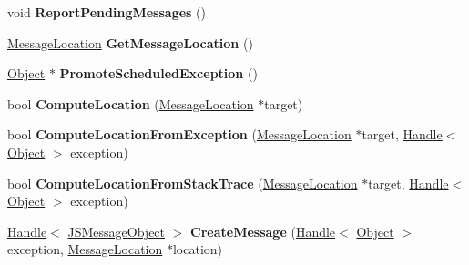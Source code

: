 \begin{DoxyCompactItemize}
\item 
void {\bfseries Report\+Pending\+Messages} ()\hypertarget{classv8_1_1internal_1_1_isolate_a9f24ef8c59fe3358df12e3310d03df08}{}\label{classv8_1_1internal_1_1_isolate_a9f24ef8c59fe3358df12e3310d03df08}

\item 
\hyperlink{classv8_1_1internal_1_1_message_location}{Message\+Location} {\bfseries Get\+Message\+Location} ()\hypertarget{classv8_1_1internal_1_1_isolate_aa250e39eefa86b3541a9aad23f46a15f}{}\label{classv8_1_1internal_1_1_isolate_aa250e39eefa86b3541a9aad23f46a15f}

\item 
\hyperlink{classv8_1_1internal_1_1_object}{Object} $\ast$ {\bfseries Promote\+Scheduled\+Exception} ()\hypertarget{classv8_1_1internal_1_1_isolate_acf696e718d6b6d349ef51a5d6e890042}{}\label{classv8_1_1internal_1_1_isolate_acf696e718d6b6d349ef51a5d6e890042}

\item 
bool {\bfseries Compute\+Location} (\hyperlink{classv8_1_1internal_1_1_message_location}{Message\+Location} $\ast$target)\hypertarget{classv8_1_1internal_1_1_isolate_a232c2200770b7f074bc99ea085350e0d}{}\label{classv8_1_1internal_1_1_isolate_a232c2200770b7f074bc99ea085350e0d}

\item 
bool {\bfseries Compute\+Location\+From\+Exception} (\hyperlink{classv8_1_1internal_1_1_message_location}{Message\+Location} $\ast$target, \hyperlink{classv8_1_1internal_1_1_handle}{Handle}$<$ \hyperlink{classv8_1_1internal_1_1_object}{Object} $>$ exception)\hypertarget{classv8_1_1internal_1_1_isolate_a1b6bc3ecccbea6802d0cab258f87a686}{}\label{classv8_1_1internal_1_1_isolate_a1b6bc3ecccbea6802d0cab258f87a686}

\item 
bool {\bfseries Compute\+Location\+From\+Stack\+Trace} (\hyperlink{classv8_1_1internal_1_1_message_location}{Message\+Location} $\ast$target, \hyperlink{classv8_1_1internal_1_1_handle}{Handle}$<$ \hyperlink{classv8_1_1internal_1_1_object}{Object} $>$ exception)\hypertarget{classv8_1_1internal_1_1_isolate_a1d016f6480e4a33563de1122c1bb2493}{}\label{classv8_1_1internal_1_1_isolate_a1d016f6480e4a33563de1122c1bb2493}

\item 
\hyperlink{classv8_1_1internal_1_1_handle}{Handle}$<$ \hyperlink{classv8_1_1internal_1_1_j_s_message_object}{J\+S\+Message\+Object} $>$ {\bfseries Create\+Message} (\hyperlink{classv8_1_1internal_1_1_handle}{Handle}$<$ \hyperlink{classv8_1_1internal_1_1_object}{Object} $>$ exception, \hyperlink{classv8_1_1internal_1_1_message_location}{Message\+Location} $\ast$location)\hypertarget{classv8_1_1internal_1_1_isolate_ab57f6fec4e74aa9994d89f584e62476f}{}\label{classv8_1_1internal_1_1_isolate_ab57f6fec4e74aa9994d89f584e62476f}


\end{DoxyCompactItemize}
